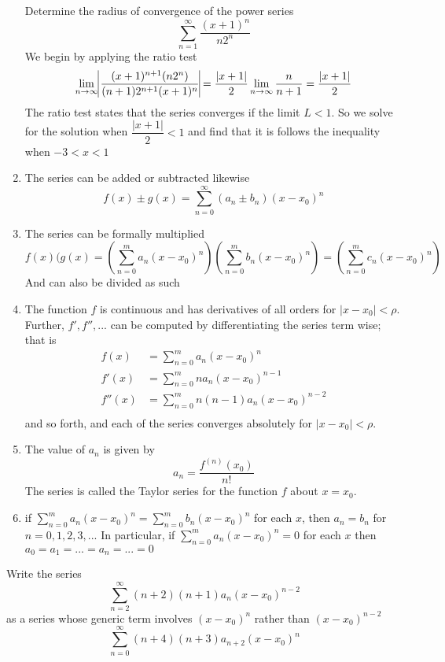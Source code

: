 \begin{enumerate}
		\begin{example}
			Determine the radius of convergence of the power series \[ \sum \limits_{n=1}^\infty \dfrac{(x+1)^n}{n2^n} \] We begin by applying the ratio test
			\[ \lim_{n \rightarrow \infty} \vline \dfrac{(x+1)^{n+1}(n2^n)}{(n+1)2^{n+1}(x+1)^n} \vline = \dfrac{|x+1|}{2} \lim_{n \rightarrow \infty} \dfrac{n}{n+1} = \dfrac{|x+1|}{2}\] The ratio test states that the series converges if the limit $ L < 1 $. So we solve for the solution when $ \dfrac{|x+1|}{2} < 1 $ and find that it is follows the inequality when $ -3<x<1 $
		\end{example}
		\item The series can be added or subtracted likewise \[ f(x) \pm g(x) = \sum \limits_{n=0}^\infty (a_n \pm b_n)(x-x_0)^n \]
		\item The series can be formally multiplied 
		\[ f(x)(g(x) = (\sum \limits_{n=0}^m a_n (x-x_0)^n)(\sum \limits_{n=0}^m b_n (x-x_0)^n) = (\sum \limits_{n=0}^m c_n (x-x_0)^n)\]
		And can also be divided as such 
		\item The function $ f $ is continuous and has derivatives of all orders for $ |x-x_0| < \rho $. Further, $ f',f'',... $ can be computed by differentiating the series term wise; that is 
		\begin{align*}
			f(x) &= \sum \limits_{n=0}^m a_n (x-x_0)^n \\
			f'(x) &= \sum \limits_{n=0}^m na_n (x-x_0)^{n-1} \\
			f''(x) &= \sum \limits_{n=0}^m n(n-1)a_n (x-x_0)^{n-2} \\
		\end{align*}
		and so forth, and each of the series converges absolutely for $ |x-x_0| < \rho $. 
		\item The value of $ a_n $ is given by \[ a_n = \dfrac{f^{(n)}(x_0)}{n!} \] The series is called the Taylor series for the function $ f $ about $ x = x_0 $.
		\item if $ \sum \limits_{n=0}^m a_n (x-x_0)^n = \sum \limits_{n=0}^m b_n (x-x_0)^n$ for each $ x $, then $ a_n = b_n $ for $ n = 0,1,2,3,... $ In particular, if $ \sum \limits_{n=0}^m a_n (x-x_0)^n  = 0$ for each $ x $ then $ a_0 = a_1 = ... = a_n = ... = 0 $
	\end{enumerate}
	\begin{example}
		Write the series \[ \sum \limits_{n=2}^{\infty} (n+2)(n+1)a_n(x-x_0)^{n-2}  \] as a series whose generic term involves $ (x-x_0)^n $ rather than $ (x-x_0)^{n-2} $
		\[ \sum \limits_{n=0}^{\infty} (n+4)(n+3)a_{n+2}(x-x_0)^{n} \]
	\end{example}
